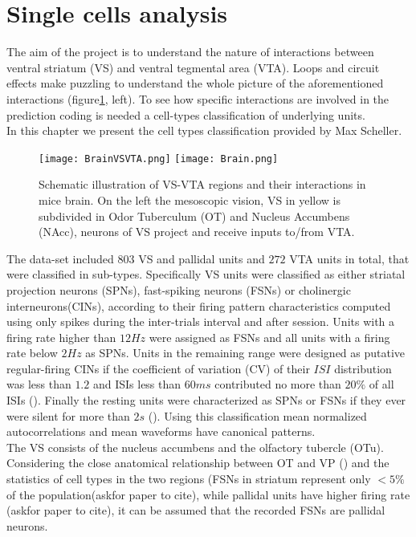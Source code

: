 
\section{Single cells analysis}
\label{chap:UnitsAnalysis}
The aim of the project is to understand the nature of interactions between ventral striatum (VS) and ventral tegmental area (VTA). Loops and circuit effects make puzzling to understand the whole picture of the aforementioned interactions (figure\ref{fig:Brain}, left). To see how specific interactions are involved in the prediction coding is needed a cell-types classification of underlying units.\\
In this chapter we present the cell types classification provided by Max Scheller.
\begin{figure}
    \centering
    \texttt{[image: BrainVSVTA.png]}
    \texttt{[image: Brain.png]}
    \caption{Schematic illustration of VS-VTA regions and their interactions in mice brain. On the left the mesoscopic vision, VS in yellow is subdivided in Odor Tuberculum (OT) and Nucleus Accumbens (NAcc), neurons of VS project and receive inputs to/from VTA.}
    \label{fig:Brain}
\end{figure}
The data-set included $803$ VS and pallidal units and $272$ VTA units in total, that were classified in sub-types. Specifically VS units were classified as either striatal projection neurons (SPNs), fast-spiking neurons (FSNs) or cholinergic interneurons(CINs), according to their firing pattern characteristics computed using only spikes during the inter-trials interval and after session. Units with a firing rate higher than $12 Hz$ were assigned as FSNs and all units with a firing rate below $2 Hz$ as SPNs. Units in the remaining range were designed as putative regular-firing CINs if the coefficient of variation (CV) of their $ISI$ distribution was less than $1.2$ and ISIs less than $60 ms$ contributed no more than $20\%$ of all ISIs (\cite{Inokawa}). Finally the resting units were characterized as SPNs or FSNs if they ever were silent for more than $2s$ (\cite{Graybiel}). Using this classification mean normalized autocorrelations and mean waveforms have canonical patterns.\\ The VS consists of the nucleus accumbens and the olfactory tubercle (OTu).
Considering the close anatomical relationship between OT and VP (\cite{Heimer1982}) and the statistics of cell types in the two regions (FSNs in striatum represent only $<5\%$ of the population({\color{red}askfor paper to cite}), while pallidal units have higher firing rate ({\color{red}askfor paper to cite}), it can be assumed that the recorded FSNs are pallidal neurons.\\
